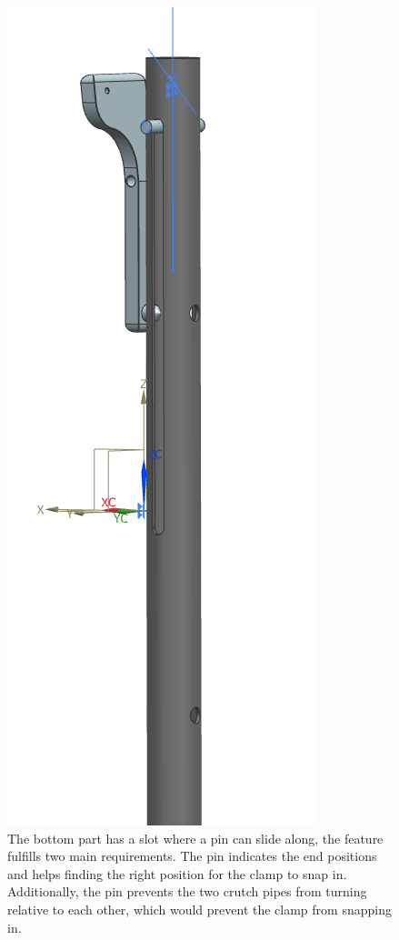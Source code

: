 \begin{figure}
    \centering
    \includegraphics[width=0.8\columnwidth]{Appendix/LAM/bottom_crutch.png}
    \caption{ The bottom part has a slot where a pin can slide along, the feature fulfills two main requirements. The pin indicates the end positions and helps finding the right position for the clamp to snap in. Additionally, the pin prevents the two crutch pipes from turning relative to each other, which would prevent the clamp from snapping in.}
    \label{fig:pin_LAM}
\end{figure}

